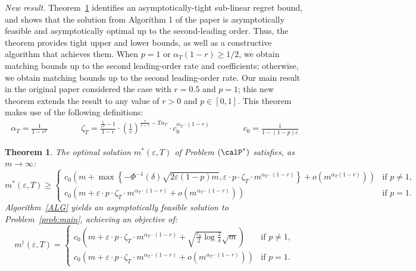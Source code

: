 \documentclass[11pt]{article}
\newtheorem{theorem}{Theorem}[] %
\begin{document}
\textit{New result.}
Theorem~\ref{thm:main_R2} identifies an asymptotically-tight sub-linear regret bound, and shows that the solution from Algorithm 1 of the paper is asymptotically feasible and asymptotically optimal up to the second-leading order. Thus, the theorem provides tight upper and lower bounds, as well as a constructive algorithm that achieves them. When $p=1$ or $\alpha_T(1-r)\geq1/2$, we obtain matching bounds up to the second leading-order rate and coefficients; otherwise, we obtain matching bounds up to the second leading-order rate. Our main result in the original paper considered the case with $r=0.5$ and $p=1$; this new theorem extends the result to any value of $r>0$ and $p\in[0,1]$. This theorem makes use of the following definitions:
\begin{align*}
	\alpha_T=\frac{1}{1-r^T}\qquad\qquad
	\zeta_T=\frac{\frac{1}{r^T}-1}{1-r}\cdot\left(\frac{1}{r}\right)^{\frac{r}{1-r}-T\alpha_T}\cdot c_0^{\alpha_T\cdot(1-r)} \qquad\qquad c_0 = \frac{1}{1-(1-p)\varepsilon}
\end{align*}
\setcounter{theorem}{0}
\begin{theorem}\label{thm:main_R2}
	The optimal solution $m^*(\varepsilon, T)$ of Problem $(\calP^*)$ satisfies, as $m \to \infty$:
    $$m^*(\varepsilon, T)\geq \begin{cases}
      c_0\left(m +\max\left\{-\Phi^{-1}(\delta)\sqrt{2\varepsilon(1-p)m}, \varepsilon \cdot p \cdot \zeta_T\cdot m^{\alpha_T\cdot(1-r)}\right\}+o\left(m^{\alpha_T(1-r)}\right)\right) & \text{if }p \neq 1,\\
          c_0\left(m +\varepsilon\cdot p\cdot\zeta_T\cdot m^{\alpha_T\cdot(1-r)} +  o\left(m^{\alpha_T\cdot(1-r)}\right)\right) & \text{if }p=1.
      \end{cases}$$
	Algorithm~\ref{ALG} yields an asymptotically feasible solution to Problem~\eqref{prob:main}, achieving an objective of:
    $$m^\dagger(\varepsilon,T)=\begin{cases}
        c_0\left( m+\varepsilon\cdot p\cdot \zeta_T \cdot m^{\alpha_T\cdot(1-r)} +  \sqrt{\frac{c_0}{2}\log \frac{2}{\delta}}\sqrt{m}\right) &  \text{if }p\neq 1,\\
   c_0\left( m+\varepsilon\cdot p\cdot \zeta_T \cdot m^{\alpha_T\cdot(1-r)} +  o\left(m^{\alpha_T\cdot(1-r)}\right)\right) &  \text{if }p=1.
    \end{cases}$$
\end{theorem}
\end{document}
